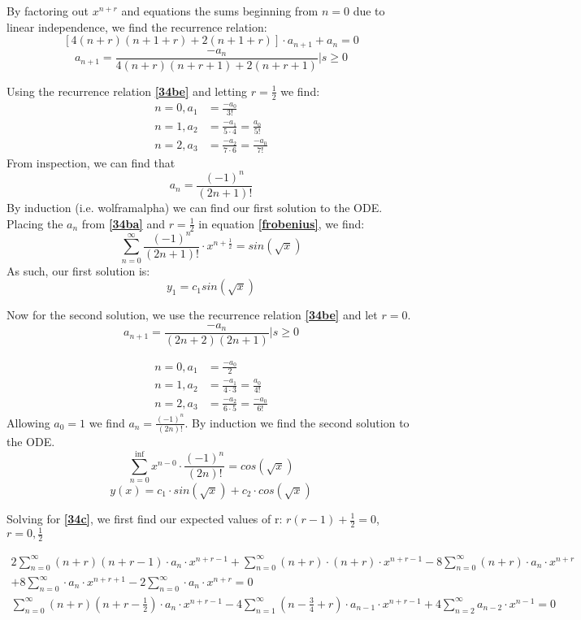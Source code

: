 \documentclass{article}
\begin{document}
By factoring out $x^{n+r}$ and equations the sums beginning from $n=0$ due to linear independence, we find the recurrence relation:
\[
\left[4(n+r)(n+1+r)+2(n+1+r)\right] \cdot a_{n+1} + a_n = 0
\]
\begin{equation}\label{34be}
a_{n+1} = \frac{-a_n}{4(n+r)(n+r+1)+2(n+r+1)} \Bigr| s\geq0
\end{equation}


Using the recurrence relation \textbf{\eqref{34be}} and letting $r=\frac{1}{2}$ we find:
\begin{align*}
n=0, a_1 &= \frac{-a_0}{3!}\\
n=1, a_2 &= \frac{-a_1}{5 \cdot 4} = \frac{a_0}{5!}\\
n=2, a_3 &= \frac{-a_2}{7 \cdot 6} = \frac{-a_0}{7!}
\end{align*}
From inspection, we can find that
\begin{equation}\label{34ba}
a_n = \frac{(-1)^n}{(2n+1)!}
\end{equation}
By induction (i.e. wolframalpha) we can find our first solution to the ODE. Placing the $a_n$ from \textbf{\eqref{34ba}} and $ r = \frac{1}{2} $ in equation \textbf{\eqref{frobenius}}, we find:
\[
\sum_{n=0}^{\infty}{\frac{(-1)^n}{(2n+1)!} \cdot x^{n+\frac{1}{2}}} = sin(\sqrt{x})
\]
As such, our first solution is:
\[y_1 = c_1sin(\sqrt{x})
\]

Now for the second solution, we use the recurrence relation \textbf{\eqref{34be}} and let $r=0$.
\[
a_{n+1} = \frac{-a_n}{(2n+2)(2n+1)} \Bigr| s\geq0
\]

\begin{align*}
n=0, a_1 &= \frac{-a_0}{2}\\
n=1, a_2 &= \frac{-a_1}{4 \cdot 3} = \frac{a_0}{4!}\\
n=2, a_3 & = \frac{-a_2}{6 \cdot 5} = \frac{-a_0}{6!}
\end{align*}
Allowing $a_0=1$ we find $a_n = \frac{(-1)^n}{(2n)!}$.
By induction we find the second solution to the ODE.
\[
\sum_{n=0}^{\inf} x^{n-0} \cdot \frac{(-1)^n}{(2n)!} = cos(\sqrt{x})
\]
\[
y(x) = c_1 \cdot sin(\sqrt{x}) + c_2 \cdot cos(\sqrt{x})
\]
\par

Solving for \textbf{\eqref{34c}}, we first find our expected values of r: $r(r-1)+\frac{1}{2} =0$, $r = 0,\frac{1}{2}$

\begin{align*}
2\sum_{n=0}^{\infty}(n+r)(n+r-1) \cdot a_n \cdot x^{n+r-1} + \sum_{n=0}^{\infty} (n+r) \cdot (n+r) \cdot x^{n+r-1} - 8\sum_{n=0}^{\infty} (n+r) \cdot a_n \cdot x^{n+r}\\
+ 8 \sum_{n=0}^{\infty} \cdot a_n \cdot x^{n+r+1} - 2 \sum_{n=0}^{\infty} \cdot a_n \cdot x^{n+r} =0\\
\sum_{n=0}^{\infty} (n+r)(n+r-\frac{1}{2}) \cdot a_n \cdot x^{n+r-1} - 4 \sum_{n=1}^{\infty} (n-\frac{3}{4}+r) \cdot a_{n-1} \cdot x^{n+r-1} + 4\sum_{n=2}^{\infty} a_{n-2} \cdot x^{n-1} = 0
\end{align*}
\end{document}
